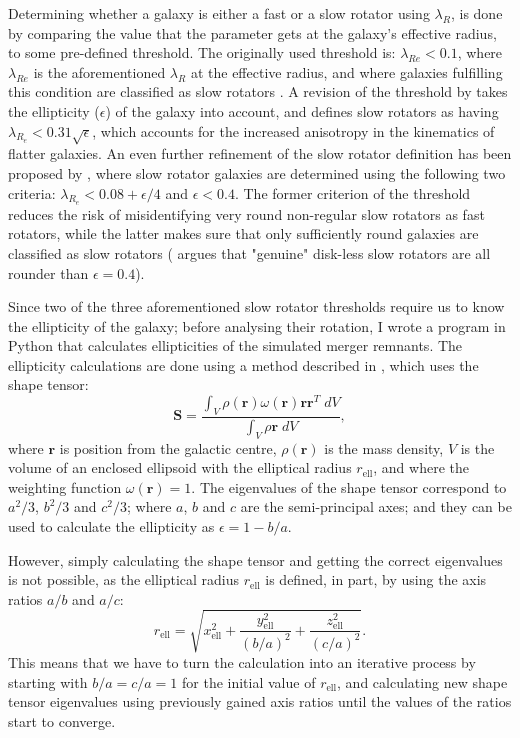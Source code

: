 \documentclass[english, oneside]{HYgradu}
\begin{document}
Determining whether a galaxy is either a fast or a slow rotator using $\lambda_R$, is done by comparing the value that the parameter gets at the galaxy's effective radius, to some pre-defined threshold. The originally used threshold is: $\lambda_{Re} < 0.1$, where $\lambda_{Re}$ is the aforementioned $\lambda_R$ at the effective radius, and where galaxies fulfilling this condition are classified as slow rotators \citep{Emsellem2007}. A revision of the threshold by \cite{Emsellem2011} takes the ellipticity ($\epsilon$) of the galaxy into account, and defines slow rotators as having $\lambda_{R_e} < 0.31 \sqrt{\epsilon}$, which accounts for the increased anisotropy in the kinematics of flatter galaxies. An even further refinement of the slow rotator definition has been proposed by \cite{Cappellari2016}, where slow rotator galaxies are determined using the following two criteria: $\lambda_{R_e} < 0.08 + \epsilon/4$ and $\epsilon < 0.4$. The former criterion of the threshold reduces the risk of misidentifying very round non-regular slow rotators as fast rotators, while the latter makes sure that only sufficiently round galaxies are classified as slow rotators (\cite{Cappellari2016} argues that "genuine" disk-less slow rotators are all rounder than $\epsilon = 0.4$).

Since two of the three aforementioned slow rotator thresholds require us to know the ellipticity of the galaxy; before analysing their rotation, I wrote a program in Python that calculates ellipticities of the simulated merger remnants. The ellipticity calculations are done using a method described in \cite{Zemp2011}, which uses the shape tensor:
\begin{equation}
\mathbf{S} = \frac{\int_V \rho(\mathbf{r}) \omega(\mathbf{r}) \mathbf{r} \mathbf{r}^T \; dV }{\int_V \rho{\mathbf{r}} \; dV},
\end{equation}
where $\mathbf{r}$ is position from the galactic centre, $\rho(\mathbf{r})$ is the mass density, $V$ is the volume of an enclosed ellipsoid with the elliptical radius $r_\mathrm{ell}$, and where the weighting function $\omega(\mathbf{r}) = 1$. The eigenvalues of the shape tensor correspond to $a^2/3$, $b^2/3$ and $c^2/3$; where $a$, $b$ and $c$ are the semi-principal axes; and they can be used to calculate the ellipticity as $\epsilon = 1 - b/a$. 

However, simply calculating the shape tensor and getting the correct eigenvalues is not possible, as the elliptical radius $r_\mathrm{ell}$ is defined, in part, by using the axis ratios $a/b$ and $a/c$:
\begin{equation}
r_\mathrm{ell} = \sqrt{x_\mathrm{ell}^2 + \frac{y_\mathrm{ell}^2}{(b/a)^2} + \frac{z_\mathrm{ell}^2}{(c/a)^2}}.
\end{equation}
This means that we have to turn the calculation into an iterative process by starting with $b/a = c/a = 1$ for the initial value of $r_\mathrm{ell}$, and calculating new shape tensor eigenvalues using previously gained axis ratios until the values of the ratios start to converge. 
\end{document}
